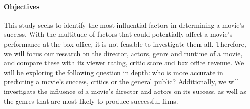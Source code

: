 \begin{multicols}{2}
        \paragraph{Objectives}
            This study seeks to identify the most influential factors in determining a
                movie's success.
            With the multitude of factors that could potentially affect a movie's
                performance at the box office, it is not feasible to investigate them all.
            Therefore, we will focus our research on the director, actors, genre and
                runtime of a movie, and compare these with its viewer rating, critic score and
                box office revenue.
            We will be exploring the following question in depth: who is more accurate in
                predicting a movie's success, critics or the general public?
            Additionally, we will investigate the influence of a movie's director and
                actors on its success, as well as the genres that are most likely to produce
                successful films.
    \end{multicols}
